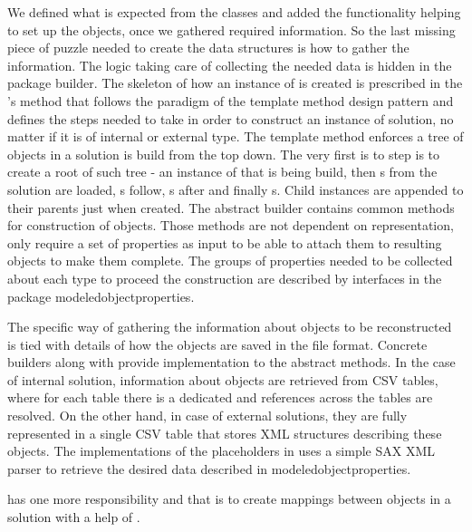 We defined what is expected from the classes and added the functionality helping to set up the objects, once we gathered required information. 
So the last missing piece of puzzle needed to create the data structures is how to gather the information.
The logic taking care of collecting the needed data is hidden in the package builder.
The skeleton of how an instance of  is created is prescribed in the 's method  that follows the paradigm of the template method design pattern and defines the steps needed to take in order to construct an instance of  solution, no matter if it is of internal or external type.
The template method enforces a tree of objects in a solution is build from the top down.
The very first is to step is to create a root of such tree - an instance of  that is being build, then s from the solution are loaded, s follow, s after and finally s. 
Child instances are appended to their parents just when created.
The abstract builder contains common methods for construction of objects. Those methods are not dependent on representation, only require a set of properties as input to be able to attach them to resulting objects to make them complete. The groups of properties needed to be collected about each type to proceed the construction are described by interfaces in the package modeledobjectproperties. 

The specific way of gathering the information about objects to be reconstructed is tied with details of how the objects are saved in the file format. Concrete builders 	 along with  provide implementation to the abstract methods.
In the case of internal solution, information about objects are retrieved from CSV tables, where for each table there is a dedicated and references across the tables are resolved.
On the other hand, in case of external solutions, they are fully represented in a single CSV table that stores XML structures describing these objects. The implementations of the placeholders in  uses a simple SAX XML parser to retrieve the desired data described in modeledobjectproperties.

 has one more responsibility and that is to create mappings between  objects in a solution with a help of . 

